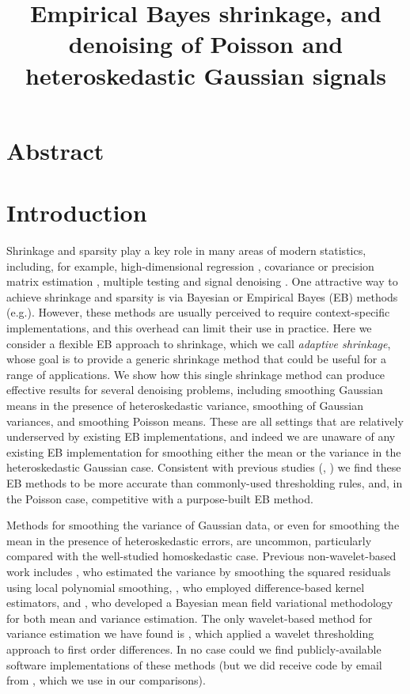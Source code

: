 \documentclass[12pt]{article}
\begin{document}
\title{\textbf{Empirical Bayes shrinkage, and denoising of Poisson and heteroskedastic Gaussian signals}}
\date{}
\maketitle

\section{Abstract}

\section{Introduction}

Shrinkage and sparsity play a key role in many areas of modern statistics, including, for example, high-dimensional regression \cite{Tibshirani1996Regression}, covariance or precision matrix estimation \cite{Bickel2008Covariance}, multiple testing \cite{efron:xx} and signal denoising \cite{Donoho1994Ideal, donoho95}. One attractive way to achieve shrinkage and sparsity is via Bayesian or Empirical Bayes (EB) methods (e.g.\cite{efron?, Johnstone2005Empirical, Clyde2000Flexible,george.mccullogh,bayesian-covariance-estimation}).  
However, these methods are usually perceived to require context-specific implementations, and this overhead can limit their use in practice. Here we consider a flexible EB approach to shrinkage, which we call {\it adaptive shrinkage}, whose goal is to provide a generic shrinkage method that could be useful for a range of applications. 
We show how this single shrinkage method can produce effective results for several denoising problems, including smoothing Gaussian means in the presence of heteroskedastic variance, smoothing of Gaussian variances, and smoothing Poisson means. These are all settings that are relatively underserved by existing EB implementations, and indeed  we are unaware of any existing EB implementation for smoothing either the mean or the variance in the heteroskedastic Gaussian case.
Consistent with previous studies (\cite{Antoniadis2001Wavelet}, \cite{Besbeas2004Comparative}) we find these EB methods to be more accurate than commonly-used thresholding rules, and, in the Poisson case, competitive with a purpose-built EB method. 

Methods for smoothing the variance of Gaussian data, or even for smoothing the mean in the presence of heteroskedastic errors, are uncommon, particularly compared with the well-studied homoskedastic case. Previous non-wavelet-based work includes \cite{Fan1998Efficient}, who estimated the variance by smoothing the squared residuals using local polynomial smoothing, \cite{Brown2007Variance}, who employed difference-based kernel estimators, and \cite{Menictas2015Variational}, who developed a Bayesian mean field variational methodology for both mean and variance estimation. The only wavelet-based method for variance estimation we have found is \cite{Cai2008Adaptive}, which applied a wavelet thresholding approach to first order differences. In no case could we find publicly-available software implementations of these methods (but we did receive
code by email from \cite{Menictas2015Variational}, which we use in our comparisons).
\end{document}
